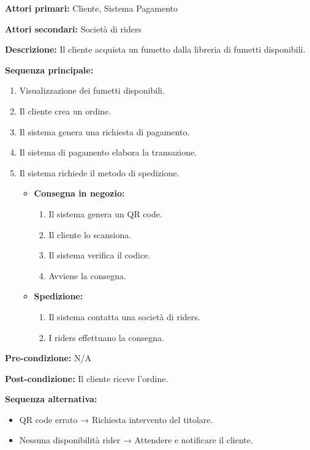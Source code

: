 \documentclass[12pt, a4paper]{article}
\begin{document}
\begin{tcolorbox}[
  title=Scenario: Acquisto,
  coltitle=black,
  colbacktitle=cyan!10,
  colback=white,           
  colframe=gray!60!black,
  fonttitle=\bfseries,
  sharp corners=south
]
\textbf{Attori primari:} Cliente, Sistema Pagamento

\textbf{Attori secondari:} Società di riders

\textbf{Descrizione:} Il cliente acquista un fumetto dalla libreria di fumetti disponibili.

\vspace{0.5em}
\textbf{Sequenza principale:}
\begin{enumerate}
  \item Visualizzazione dei fumetti disponibili.
  \item Il cliente crea un ordine.
  \item Il sistema genera una richiesta di pagamento.
  \item Il sistema di pagamento elabora la transazione.
  \item Il sistema richiede il metodo di spedizione.
  \begin{itemize}
    \item \textbf{Consegna in negozio:}
    \begin{enumerate}
      \item Il sistema genera un QR code.
      \item Il cliente lo scansiona.
      \item Il sistema verifica il codice.
      \item Avviene la consegna.
    \end{enumerate}
    \item \textbf{Spedizione:}
    \begin{enumerate}
      \item Il sistema contatta una società di riders.
      \item I riders effettuano la consegna.
    \end{enumerate}
  \end{itemize}
\end{enumerate}

\textbf{Pre-condizione:} N/A

\textbf{Post-condizione:} Il cliente riceve l’ordine.

\textbf{Sequenza alternativa:}
\begin{itemize}
  \item QR code errato → Richiesta intervento del titolare.
  \item Nessuna disponibilità rider → Attendere e notificare il cliente.
\end{itemize}
\end{tcolorbox}
\end{document}
